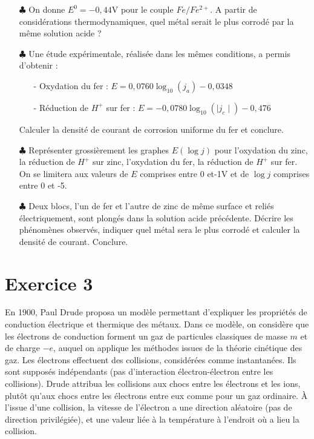 \documentclass{report}
\begin{document}
\begin{itemize}
	
		\item[$\clubsuit$] On donne $E^0=-0,44$V pour le couple $Fe/Fe^{2+}$. A partir de considérations thermodynamiques, quel métal serait le plus corrodé par la même solution acide ?
		
	\item[$\clubsuit$] Une étude expérimentale, réalisée dans les mêmes conditions, a permis d'obtenir :
	\begin{itemize}
		\item[-] Oxydation du fer : $E=0,0760\log_{10}(j_a)-0,0348$
		\item[-] Réduction de $H^+$ sur fer : $E=-0,0780\log_{10}(\mid j_c\mid)-0,476$
	\end{itemize}
	Calculer la densité de courant de corrosion uniforme du fer et conclure.
		
	\item[$\clubsuit$] Représenter grossièrement les graphes $E(\log j)$ pour l'oxydation du zinc, la réduction de $H^+$ sur zinc, l'oxydation du fer, la réduction de $H^+$ sur fer. On se limitera aux valeurs de $E$ comprises entre 0 et-1V et de $\log j$ comprises entre 0 et -5.
	
	\item[$\clubsuit$] Deux blocs, l'un de fer et l'autre de zinc de même surface et reliés électriquement, sont plongés dans la solution acide précédente. Décrire les phénomènes observés, indiquer quel métal sera le plus corrodé et calculer la densité de courant. Conclure. 
	
\end{itemize}

\newpage

\section*{Exercice 3}

En 1900, Paul Drude proposa un modèle permettant d'expliquer les propriétés de conduction électrique et thermique des métaux. Dans ce modèle, on considère que les électrons de conduction forment un gaz de particules classiques de masse $m$ et de charge $-e$, auquel on applique les méthodes issues de la théorie cinétique des gaz. Les électrons effectuent des collisions, considérées comme instantanées. Ils sont supposés indépendants (pas d'interaction électron-électron entre les collisions). Drude attribua les collisions aux chocs entre les électrons et les ions, plutôt qu'aux chocs entre les électrons entre eux comme pour un gaz ordinaire. À l'issue d'une collision, la vitesse de l'électron a une direction aléatoire (pas de direction privilégiée), et une valeur liée à la température à l'endroit où a lieu la collision.
\end{document}
